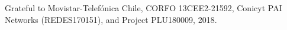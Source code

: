 \documentclass[sigconf]{acmart}
\begin{document}





%
\begin{acks}
  Grateful to Movistar-Telef\'onica Chile, CORFO 13CEE2-21592, Conicyt
  PAI Networks (REDES170151), and Project PLU180009, 2018.
\end{acks}

%


\end{document}
